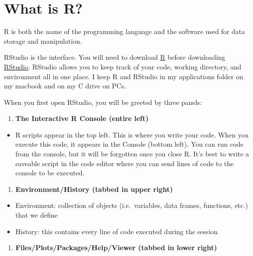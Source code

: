 \documentclass[
]{book}
\makeatletter
\newcommand*\pandocbounded[1]{%
  \sbox\pandoc@box{#1}%
  \Gscale@div\@tempa{\textheight}{\dimexpr\ht\pandoc@box+\dp\pandoc@box\relax}%
  \Gscale@div\@tempb{\linewidth}{\wd\pandoc@box}%
  \ifdim\@tempb\p@<\@tempa\p@\let\@tempa\@tempb\fi%
  \ifdim\@tempa\p@<\p@\scalebox{\@tempa}{\usebox\pandoc@box}%
  \else\usebox{\pandoc@box}%
  \fi%
}
\providecommand{\tightlist}{%
  \setlength{\itemsep}{0pt}\setlength{\parskip}{0pt}}
\makeatother
\begin{document}
\section{What is R?}\label{what-is-r}

R is both the name of the programming language and the software used for data storage and manipulation.

RStudio is the interface. You will need to download \href{https://cran.r-project.org}{R} before downloading
\href{https://posit.co/downloads/}{RStudio}. RStudio allows you to keep track of your code, working directory, and environment all in one place. I keep R and RStudio in my applications folder on my macbook and on my C drive on PCs.

When you first open RStudio, you will be greeted by three panels:

\pandocbounded{\texttt{[image: ./docs/files/RStudio.png]}}

\begin{enumerate}
\def\labelenumi{\arabic{enumi})}
\tightlist
\item
  \textbf{The Interactive R Console (entire left)}
\end{enumerate}

\begin{itemize}
\tightlist
\item
  R scripts appear in the top left. This is where you write your code. When you execute this code, it appears in the Console (bottom left). You can run code from the console, but it will be forgotten once you close R. It's best to write a saveable script in the code editor where you can send lines of code to the console to be executed.
\end{itemize}

\begin{enumerate}
\def\labelenumi{\arabic{enumi})}
\setcounter{enumi}{1}
\tightlist
\item
  \textbf{Environment/History (tabbed in upper right)}
\end{enumerate}

\begin{itemize}
\tightlist
\item
  Environment: collection of objects (i.e.~variables, data frames, functions, etc.) that we define
\item
  History: this contains every line of code executed during the session
\end{itemize}

\begin{enumerate}
\def\labelenumi{\arabic{enumi})}
\setcounter{enumi}{2}
\tightlist
\item
  \textbf{Files/Plots/Packages/Help/Viewer (tabbed in lower right)}
\end{enumerate}
\end{document}
